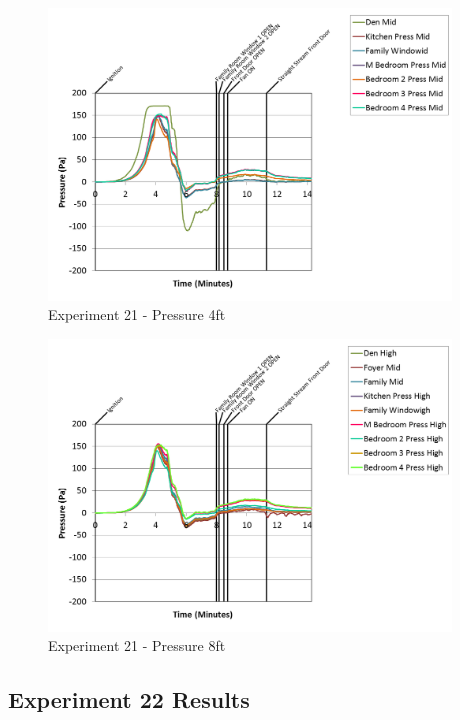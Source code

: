 \documentclass{article}
\begin{document}
\begin{appendices}
\clearpage

\begin{figure}[h!]
	\centering
	\includegraphics[height=3.05in]{0_Images/Results_Charts/Exp_21_Charts/Pressure4ft.png}
	\caption{Experiment 21 - Pressure 4ft}
\end{figure}


\begin{figure}[h!]
	\centering
	\includegraphics[height=3.05in]{0_Images/Results_Charts/Exp_21_Charts/Pressure8ft.png}
	\caption{Experiment 21 - Pressure 8ft}
\end{figure}

\clearpage

\clearpage
\clearpage		\large
\subsection{Experiment 22 Results} \label{App:Exp22Results} 


\end{appendices}
\end{document}
